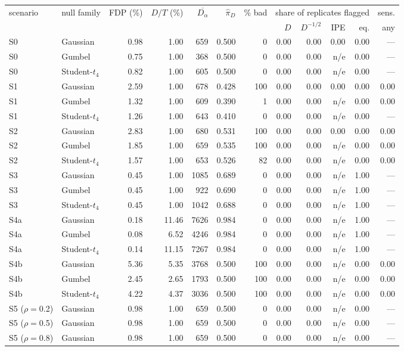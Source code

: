 \begin{tabular}{llrrrrrrrrrr}
\toprule
scenario & null family & FDP (\%) & $D/T$ (\%) & $\overline{D_\alpha}$ & $\widehat\pi_D$ & \% bad & \multicolumn{4}{c}{share of replicates flagged} & sens. \\
 & & & & & & & $D$ & $D^{-1/2}$ & IPE & eq. & any \\
\midrule
S0 & Gaussian & 0.98 & 1.00 & 659 & 0.500 & 0 & 0.00 & 0.00 & 0.00 & 0.00 & --- \\
S0 & Gumbel & 0.75 & 1.00 & 368 & 0.500 & 0 & 0.00 & 0.00 & n/e & 0.00 & --- \\
S0 & Student-$t_4$ & 0.82 & 1.00 & 605 & 0.500 & 0 & 0.00 & 0.00 & n/e & 0.00 & --- \\
S1 & Gaussian & 2.59 & 1.00 & 678 & 0.428 & 100 & 0.00 & 0.00 & 0.00 & 0.00 & 0.00 \\
S1 & Gumbel & 1.32 & 1.00 & 609 & 0.390 & 1 & 0.00 & 0.00 & n/e & 0.00 & 0.00 \\
S1 & Student-$t_4$ & 1.26 & 1.00 & 643 & 0.410 & 0 & 0.00 & 0.00 & n/e & 0.00 & --- \\
S2 & Gaussian & 2.83 & 1.00 & 680 & 0.531 & 100 & 0.00 & 0.00 & 0.00 & 0.00 & 0.00 \\
S2 & Gumbel & 1.85 & 1.00 & 659 & 0.535 & 100 & 0.00 & 0.00 & n/e & 0.00 & 0.00 \\
S2 & Student-$t_4$ & 1.57 & 1.00 & 653 & 0.526 & 82 & 0.00 & 0.00 & n/e & 0.00 & 0.00 \\
S3 & Gaussian & 0.45 & 1.00 & 1085 & 0.689 & 0 & 0.00 & 0.00 & n/e & 1.00 & --- \\
S3 & Gumbel & 0.45 & 1.00 & 922 & 0.690 & 0 & 0.00 & 0.00 & n/e & 1.00 & --- \\
S3 & Student-$t_4$ & 0.45 & 1.00 & 1042 & 0.688 & 0 & 0.00 & 0.00 & n/e & 1.00 & --- \\
S4a & Gaussian & 0.18 & 11.46 & 7626 & 0.984 & 0 & 0.00 & 0.00 & n/e & 1.00 & --- \\
S4a & Gumbel & 0.08 & 6.52 & 4246 & 0.984 & 0 & 0.00 & 0.00 & n/e & 1.00 & --- \\
S4a & Student-$t_4$ & 0.14 & 11.15 & 7267 & 0.984 & 0 & 0.00 & 0.00 & n/e & 1.00 & --- \\
S4b & Gaussian & 5.36 & 5.35 & 3768 & 0.500 & 100 & 0.00 & 0.00 & n/e & 0.00 & 0.00 \\
S4b & Gumbel & 2.45 & 2.65 & 1793 & 0.500 & 100 & 0.00 & 0.00 & n/e & 0.00 & 0.00 \\
S4b & Student-$t_4$ & 4.22 & 4.37 & 3036 & 0.500 & 100 & 0.00 & 0.00 & n/e & 0.00 & 0.00 \\
S5 ($\rho=$0.2) & Gaussian & 0.98 & 1.00 & 659 & 0.500 & 0 & 0.00 & 0.00 & n/e & 0.00 & --- \\
S5 ($\rho=$0.5) & Gaussian & 0.98 & 1.00 & 659 & 0.500 & 0 & 0.00 & 0.00 & n/e & 0.00 & --- \\
S5 ($\rho=$0.8) & Gaussian & 0.98 & 1.00 & 659 & 0.500 & 0 & 0.00 & 0.00 & n/e & 0.00 & --- \\
\bottomrule
\end{tabular}
